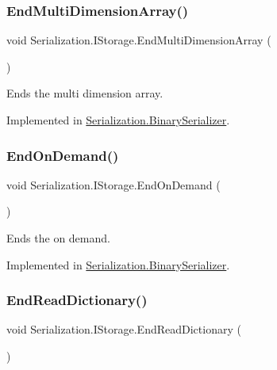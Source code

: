 \subsubsection{\texorpdfstring{End\+Multi\+Dimension\+Array()}{EndMultiDimensionArray()}}
{\footnotesize\ttfamily void Serialization.\+I\+Storage.\+End\+Multi\+Dimension\+Array (\begin{DoxyParamCaption}{ }\end{DoxyParamCaption})}



Ends the multi dimension array. 



Implemented in \hyperlink{class_serialization_1_1_binary_serializer_a93ce28fd88cc7a06daac35287b46664b}{Serialization.\+Binary\+Serializer}.

\mbox{\label{interface_serialization_1_1_i_storage_a40adb4b1e7b959e0b3baa509d3ce16f7}} 
\subsubsection{\texorpdfstring{End\+On\+Demand()}{EndOnDemand()}}
{\footnotesize\ttfamily void Serialization.\+I\+Storage.\+End\+On\+Demand (\begin{DoxyParamCaption}{ }\end{DoxyParamCaption})}



Ends the on demand. 



Implemented in \hyperlink{class_serialization_1_1_binary_serializer_a6a8d02da39538d740b84832d03a58766}{Serialization.\+Binary\+Serializer}.

\mbox{\label{interface_serialization_1_1_i_storage_a361427cb53d37e663b456b97d087575b}} 
\subsubsection{\texorpdfstring{End\+Read\+Dictionary()}{EndReadDictionary()}}
{\footnotesize\ttfamily void Serialization.\+I\+Storage.\+End\+Read\+Dictionary (\begin{DoxyParamCaption}{ }\end{DoxyParamCaption})}




